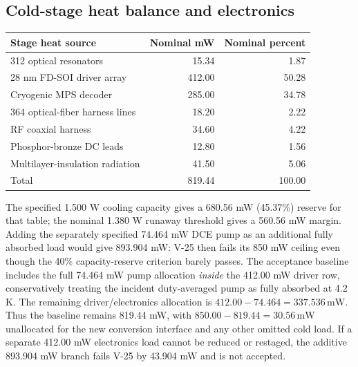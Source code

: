 \documentclass[11pt,a4paper]{article}
\newcommand{\unit}[1]{\,\mathrm{#1}}
\begin{document}
\subsection{Cold-stage heat balance and electronics}
\begin{center}\small
\begin{tabular}{@{}lrr@{}}\toprule
Stage heat source & Nominal mW & Nominal percent\\\midrule
312 optical resonators & 15.34 & 1.87\\
28 nm FD-SOI driver array & 412.00 & 50.28\\
Cryogenic MPS decoder & 285.00 & 34.78\\
364 optical-fiber harness lines & 18.20 & 2.22\\
RF coaxial harness & 34.60 & 4.22\\
Phosphor-bronze DC leads & 12.80 & 1.56\\
Multilayer-insulation radiation & 41.50 & 5.06\\\midrule
Total & 819.44 & 100.00\\\bottomrule
\end{tabular}\end{center}
The specified 1.500 W cooling capacity gives a 680.56 mW (45.37\%) reserve for that table;
the nominal 1.380 W runaway threshold gives a 560.56 mW margin. Adding the separately
specified 74.464 mW DCE pump as an additional fully absorbed load would give 893.904 mW:
V-25 then fails its 850 mW ceiling even though the 40\% capacity-reserve criterion barely
passes. The acceptance baseline includes the full 74.464 mW pump allocation \emph{inside}
the 412.00 mW driver row, conservatively treating the incident duty-averaged pump as fully
absorbed at 4.2 K. The remaining driver/electronics allocation is
$412.00-74.464=337.536\unit{mW}$. Thus the baseline remains 819.44 mW, with
$850.00-819.44=30.56\unit{mW}$ unallocated for the new conversion interface and any
other omitted cold load. If a separate 412.00 mW electronics load cannot be reduced or
restaged, the additive 893.904 mW branch fails V-25 by 43.904 mW and is not accepted.
\end{document}
